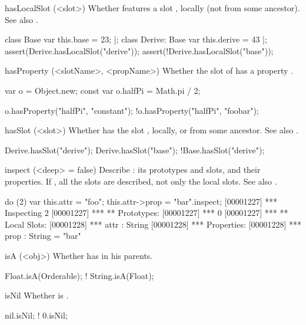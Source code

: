 \begin{urbiscriptapi}
\item[hasLocalSlot](<slot>)%
  Whether \this features a slot , locally (not from some
  ancestor).  See also .
\begin{urbiscript}
class Base         { var this.base = 23; } |;
class Derive: Base { var this.derive = 43 } |;
assert(Derive.hasLocalSlot("derive"));
assert(!Derive.hasLocalSlot("base"));
\end{urbiscript}


\item[hasProperty](<slotName>, <propName>)%
  Whether the slot  of \this has a property .
\begin{urbiassert}
var o = Object.new;
const var o.halfPi = Math.pi / 2;

 o.hasProperty("halfPi", "constant");
!o.hasProperty("halfPi", "foobar");
\end{urbiassert}


\item[hasSlot](<slot>)%
  Whether \this has the slot , locally, or from
  some ancestor.  See also .

\begin{urbiassert}
Derive.hasSlot("derive");
Derive.hasSlot("base");
!Base.hasSlot("derive");
\end{urbiassert}


\item[inspect](<deep> = false)%
  Describe \this: its prototypes and slots, and their
  properties.  If , all the slots are described, not only
  the local slots. See also .
\begin{urbiscript}
do (2) { var this.attr = "foo"; this.attr->prop = "bar"}.inspect;
[00001227] *** Inspecting 2
[00001227] *** ** Prototypes:
[00001227] ***   0
[00001227] *** ** Local Slots:
[00001228] ***   attr : String
[00001228] ***     Properties:
[00001228] ***      prop : String = "bar"
\end{urbiscript}


\item[isA](<obj>)%
  Whether \this has  in his parents.
\begin{urbiassert}
   Float.isA(Orderable);
! String.isA(Float);
\end{urbiassert}


\item[isNil]%
  Whether \this is .
\begin{urbiassert}
 nil.isNil;
!  0.isNil;
\end{urbiassert}



\end{urbiscriptapi}
